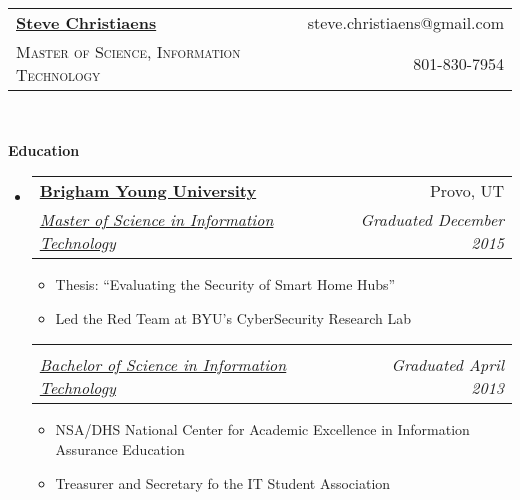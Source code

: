 \documentclass[letterpaper,11pt]{article}
\makeatletter
\newcommand{\resitem}[1]{\item #1 \vspace{-2pt}}
\newcommand{\resheading}[1]{{\large \colorbox{mygrey}{\begin{minipage}{\textwidth}{\textbf{#1 \vphantom{p\^{E}}}}\end{minipage}}}}
\newcommand{\ressubheading}[4]{
\begin{tabular*}{6.5in}{l@{\extracolsep{\fill}}r}
		\textbf{#1} & #2 \\
		\textit{#3} & \textit{#4} \\
\end{tabular*}\vspace{-6pt}}
\makeatother
\begin{document}
\newcommand{\mywebheader}{
\begin{tabular*}{7in}{l@{\extracolsep{\fill}}r}
	\textbf{\href{}{\LARGE Steve Christiaens}} & %
	{steve.christiaens@gmail.com}\\
	{\footnotesize \textsc{Master of Science, Information Technology}} & {801-830-7954} \\
	\end{tabular*}
\\
\vspace{0.1in}}

\mywebheader
\begin{comment}
	Consider adding a "QUALIFICATIONS" sections
\end{comment}
\resheading{Education}
	\begin{itemize}
		\item
			\ressubheading{\href{}{Brigham Young University}}{Provo, UT}{\href{}{Master of Science in Information Technology} \href{}{}}{Graduated December 2015}
			{ \footnotesize
				\begin{itemize}
					\resitem{Thesis: ``Evaluating the Security of Smart Home Hubs''}
					\resitem{Led the Red Team at BYU's CyberSecurity Research Lab} 
				\end{itemize}
			}				
			\vspace{-15pt} %
			\ressubheading{\href{}{}}{}{\href{}{Bachelor of Science in Information Technology}\href{}{}}{Graduated April 2013}
				{ \footnotesize
					\begin{itemize}
						\resitem{NSA/DHS National Center for Academic Excellence in Information Assurance Education}
						\resitem{Treasurer and Secretary fo the IT Student Association} 
					\end{itemize}
				}
	\end{itemize} %
\end{document}
